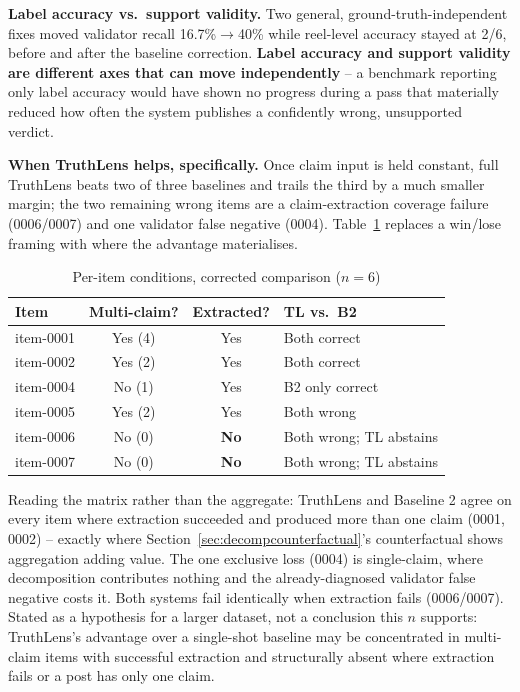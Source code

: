 \documentclass[conference]{IEEEtran}
\begin{document}
\textbf{Label accuracy vs.\ support validity.} Two general,
ground-truth-independent fixes moved validator recall 16.7\%$\to$40\%
while reel-level accuracy stayed at 2/6, before and after the baseline
correction. \textbf{Label accuracy and support validity are different
axes that can move independently} -- a benchmark reporting only label
accuracy would have shown no progress during a pass that materially
reduced how often the system publishes a confidently wrong, unsupported
verdict.

\textbf{When TruthLens helps, specifically.} Once claim input is held
constant, full TruthLens beats two of three baselines and trails the
third by a much smaller margin; the two remaining wrong items are a
claim-extraction coverage failure (0006/0007) and one validator false
negative (0004). Table~\ref{tab:whenhelps} replaces a win/lose framing
with where the advantage materialises.
\begin{table}[!t]
\caption{Per-item conditions, corrected comparison ($n=6$)}
\label{tab:whenhelps}
\centering
\scriptsize
\setlength{\tabcolsep}{3.5pt}
\begin{tabular}{lccl}
\toprule
Item & Multi-claim? & Extracted? & TL vs.\ B2 \\
\midrule
item-0001 & Yes (4) & Yes & Both correct \\
item-0002 & Yes (2) & Yes & Both correct \\
item-0004 & No (1) & Yes & B2 only correct \\
item-0005 & Yes (2) & Yes & Both wrong \\
item-0006 & No (0) & \textbf{No} & Both wrong; TL abstains \\
item-0007 & No (0) & \textbf{No} & Both wrong; TL abstains \\
\bottomrule
\end{tabular}
\end{table}

Reading the matrix rather than the aggregate: TruthLens and Baseline 2
agree on every item where extraction succeeded and produced more than one
claim (0001, 0002) -- exactly where
Section~\ref{sec:decompcounterfactual}'s counterfactual shows aggregation
adding value. The one exclusive loss (0004) is single-claim, where
decomposition contributes nothing and the already-diagnosed validator
false negative costs it. Both systems fail identically when extraction
fails (0006/0007). Stated as a hypothesis for a larger dataset, not a
conclusion this $n$ supports: TruthLens's advantage over a single-shot
baseline may be concentrated in multi-claim items with successful
extraction and structurally absent where extraction fails or a post has
only one claim.
\end{document}

